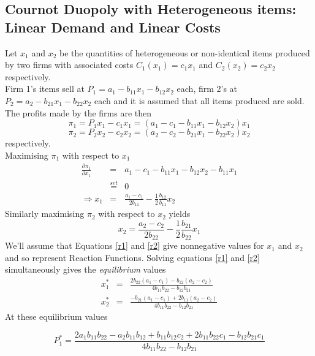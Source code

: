 \documentclass[a4paper,12pt]{article}
\begin{document}
\begin{center}
\section*{Cournot Duopoly with Heterogeneous items: Linear Demand and Linear Costs %
}
\end{center}
Let $x_1$ and $x_2$ be the quantities of heterogeneous or non-identical items produced by two firms with associated costs $C_1(x_1) = c_1x_1$ and $C_2(x_2)= c_2x_2$ respectively.\\
Firm 1's items sell at $P_1 = a_1 - b_{11}x_1-b_{12}x_2$ each, firm 2's at $P_2 = a_2 - b_{21}x_1-b_{22}x_2$ each and it is assumed that all items produced are sold. 
\\ The profits made by the firms are then
$$ \pi_1 = P_1 x_1 - c_1 x_1 = \left(a_1-c_1 - b_{11}x_1 - b_{12}x_2\right)x_1$$
$$ \pi_2 = P_2 x_2 - c_2 x_2 =\left(a_2-c_2 - b_{21}x_1 - b_{22}x_2\right)x_2$$
respectively.\\
Maximising $\pi_1$ with respect to $x_1$
\begin{eqnarray}
 \frac{\partial \pi_1} {\partial x_1} &=& a_1-c_1 - b_{11}x_1 - b_{12}x_2 - b_{11}x_1 \nonumber \\
 & \stackrel{set}{=} & 0 \nonumber \\
 \Rightarrow x_1 &=& \frac{a_1-c_1}{2b_{11}} - \frac{1}{2}\frac{b_{12}}{b_{11}} x_2 \label{r1}
 \end{eqnarray}
 Similarly maximising $\pi_2$ with respect to $x_2$ yields
 \begin{equation} x_2 =  \frac{a_2-c_2}{2b_{22}} - \frac{1}{2}\frac{b_{21}}{b_{22}} x_1 \label{r2} \end{equation}
 We'll assume that Equations \ref{r1} and \ref{r2} give nonnegative values for $x_1$ and $x_2$ and so represent Reaction Functions.
 Solving equations \ref{r1} and \ref{r2} simultaneously gives the \textit{equilibrium} values
 \begin{eqnarray*}
   x^*_1 &=& \frac{2b_{22}(a_1-c_1)-b_{12}(a_2-c_2)}{4b_{11}b_{22}-b_{12}b_{21}} \\
   x^*_2 &=& \frac{-b_{21}(a_1-c_1)+2b_{11}(a_2-c_2)}{4b_{11}b_{22}-b_{12}b_{21}}
 \end{eqnarray*}
 At these equilibrium values

$$P^*_1  = \frac{2a_1b_{11} b_{22} - a_2 b_{11} b_{12} + b_{11} b_{12} c_2
  + 2 b_{11} b_{22} c_1 - b_{12} b_{21} c_1}{4 b_{11} b_{22} - b_{12} b_{21}}$$
\end{document}
